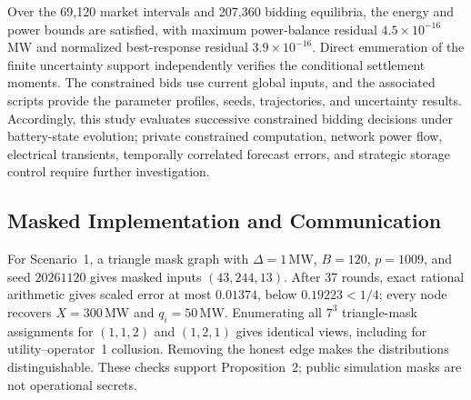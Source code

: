 \documentclass[journal]{IEEEtran}
\begin{document}
\begin{table}[t]
\centering
\caption{Synthetic 48-hour performance per operator. Cash gain is the retuned-minus-RN difference with an approximate paired 95\% confidence interval over 30 independent replicates. Export shortfalls are in kWh, ordered RN / fixed ERS / retuned.}
\label{tab:dynamic_results}
\end{table}

Over the 69,120 market intervals and 207,360 bidding equilibria, the energy and power bounds are satisfied, with maximum power-balance residual $4.5\times10^{-16}$\,MW and normalized best-response residual $3.9\times10^{-16}$. Direct enumeration of the finite uncertainty support independently verifies the conditional settlement moments. The constrained bids use current global inputs, and the associated scripts provide the parameter profiles, seeds, trajectories, and uncertainty results. Accordingly, this study evaluates successive constrained bidding decisions under battery-state evolution; private constrained computation, network power flow, electrical transients, temporally correlated forecast errors, and strategic storage control require further investigation.

\subsection{Masked Implementation and Communication}

For Scenario~1, a triangle mask graph with $\Delta=1$\,MW, $B=120$, $p=1009$, and seed $20261120$ gives masked inputs $(43,244,13)$. After 37 rounds, exact rational arithmetic gives scaled error at most $0.01374$, below $0.19223<1/4$; every node recovers $X=300$\,MW and $q_i=50$\,MW. Enumerating all $7^3$ triangle-mask assignments for $(1,1,2)$ and $(1,2,1)$ gives identical views, including for utility--operator~1 collusion. Removing the honest edge makes the distributions distinguishable. These checks support Proposition~2; public simulation masks are not operational secrets.
\end{document}
